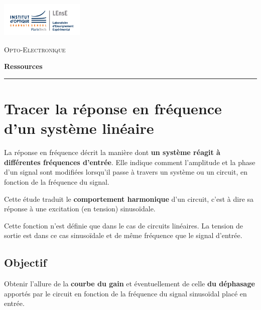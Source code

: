 \newpage
\pagestyle{empty}

\begin{minipage}[c]{.25\linewidth}
	\includegraphics[width=4cm]{images/Logo-LEnsE.png}
\end{minipage} \hfill
\begin{minipage}[c]{.4\linewidth}

\begin{center}
\vspace{0.3cm}
{\Large \textsc{Opto-Electronique}}

\medskip

\textbf{\Large Ressources}

\end{center}
\end{minipage}\hfill

\vspace{0.5cm}

\noindent \rule{\linewidth}{1pt}
\section{Tracer la réponse en fréquence d'un système linéaire}
\label{ressource:RepFreq}



La réponse en fréquence décrit la manière dont \textbf{un système réagit à différentes fréquences d'entrée}. Elle indique comment l'amplitude et la phase d'un signal sont modifiées lorsqu'il passe à travers un système ou un circuit, en fonction de la fréquence du signal.

Cette étude traduit le \textbf{comportement harmonique} d'un circuit, c'est à dire sa réponse à une excitation (en tension) sinusoïdale.

Cette fonction n'est définie que dans le cas de circuits linéaires. La tension de sortie est dans ce cas sinusoïdale et de même fréquence que le signal d'entrée.

\subsection{Objectif}

Obtenir l'allure de la \textbf{courbe du gain} et éventuellement de celle \textbf{du déphasage} apportés par le circuit en fonction de la fréquence du signal sinusoïdal placé en entrée.

